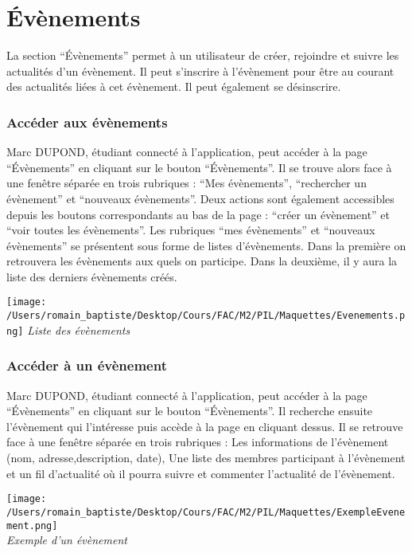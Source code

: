 \section*{Évènements}
La section “Évènements” permet à un utilisateur de créer, rejoindre et suivre les actualités d’un évènement. Il peut s’inscrire à l’évènement pour être au courant des actualités liées à cet évènement. Il peut également se désinscrire. 
\subsubsection*{Accéder aux évènements}
Marc DUPOND, étudiant connecté à l’application, peut accéder à la page “Évènements” en cliquant sur le bouton “Évènements”. Il se trouve alors face à une fenêtre séparée en trois rubriques : “Mes évènements”, “rechercher un évènement” et “nouveaux évènements”. Deux actions sont également accessibles depuis les boutons correspondants au bas de la page : “créer un évènement” et “voir toutes les évènements”.
	Les rubriques “mes évènements” et “nouveaux évènements” se présentent sous forme de listes d’évènements. Dans la première on retrouvera les évènements aux quels on participe. Dans la deuxième, il y aura la liste des derniers évènements créés.
\begin{center}
\texttt{[image: /Users/romain\_baptiste/Desktop/Cours/FAC/M2/PIL/Maquettes/Evenements.png]}
\emph{Liste des évènements}
\end{center}
\subsubsection*{Accéder à un évènement}
Marc DUPOND, étudiant connecté à l’application, peut accéder à la page “Évènements” en cliquant sur le bouton “Évènements”. Il recherche ensuite l’évènement qui l’intéresse puis accède à la page en cliquant dessus. Il se retrouve face à une fenêtre séparée en trois rubriques : Les informations de l’évènement (nom, adresse,description, date), Une liste des membres participant à l’évènement et un fil d’actualité où il pourra suivre et commenter l’actualité de l’évènement.
\begin{center}
\texttt{[image: /Users/romain\_baptiste/Desktop/Cours/FAC/M2/PIL/Maquettes/ExempleEvenement.png]}
\\
\emph{Exemple d'un évènement}
\end{center}
